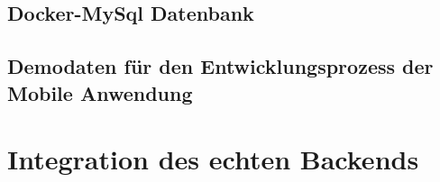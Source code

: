 \subsection{Docker-MySql Datenbank}

\subsection{Demodaten für den Entwicklungsprozess der Mobile Anwendung}

\section{Integration des echten Backends}
